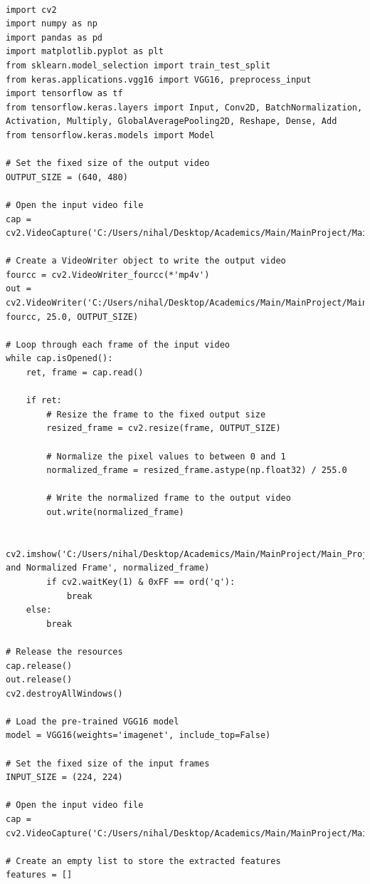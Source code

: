 \documentclass[12pt]{report}
\begin{document}
\begin{lstlisting}

import cv2
import numpy as np
import pandas as pd
import matplotlib.pyplot as plt
from sklearn.model_selection import train_test_split
from keras.applications.vgg16 import VGG16, preprocess_input
import tensorflow as tf
from tensorflow.keras.layers import Input, Conv2D, BatchNormalization, Activation, Multiply, GlobalAveragePooling2D, Reshape, Dense, Add
from tensorflow.keras.models import Model

# Set the fixed size of the output video
OUTPUT_SIZE = (640, 480)

# Open the input video file
cap = cv2.VideoCapture('C:/Users/nihal/Desktop/Academics/Main/MainProject/Main_Project/Project/videos/1.mp4')

# Create a VideoWriter object to write the output video
fourcc = cv2.VideoWriter_fourcc(*'mp4v')
out = cv2.VideoWriter('C:/Users/nihal/Desktop/Academics/Main/MainProject/Main_Project/Project/videos/output_video1.mp4', fourcc, 25.0, OUTPUT_SIZE)

# Loop through each frame of the input video
while cap.isOpened():
    ret, frame = cap.read()
    
    if ret:
        # Resize the frame to the fixed output size
        resized_frame = cv2.resize(frame, OUTPUT_SIZE)
        
        # Normalize the pixel values to between 0 and 1
        normalized_frame = resized_frame.astype(np.float32) / 255.0
        
        # Write the normalized frame to the output video
        out.write(normalized_frame)
        
        cv2.imshow('C:/Users/nihal/Desktop/Academics/Main/MainProject/Main_Project/Project/frame1/Resized and Normalized Frame', normalized_frame)
        if cv2.waitKey(1) & 0xFF == ord('q'):
            break
    else:
        break

# Release the resources
cap.release()
out.release()
cv2.destroyAllWindows()

# Load the pre-trained VGG16 model
model = VGG16(weights='imagenet', include_top=False)

# Set the fixed size of the input frames
INPUT_SIZE = (224, 224)

# Open the input video file
cap = cv2.VideoCapture('C:/Users/nihal/Desktop/Academics/Main/MainProject/Main_Project/Project/videos/output_video1.mp4')

# Create an empty list to store the extracted features
features = []


\end{lstlisting}
\end{document}
